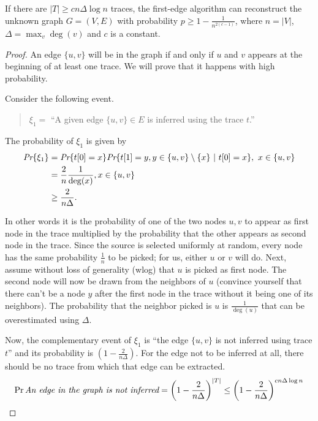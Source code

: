 \begin{thm}
    If there are $|T| \geq cn\Delta\log n$ traces, the first-edge algorithm can reconstruct the unknown graph $G=(V, E)$ with probability $p \geq 1 - \frac{1}{n^{2(c-1)}}$, where $n = |V|$, $\Delta = \max_v \deg(v)$ and $c$ is a constant.
\end{thm}
\begin{proof}
	An edge $\{u, v\}$ will be in the graph if and only if $u$ and $v$ appears at the beginning of at least one trace. We will prove that it happens with high probability.
	
	Consider the following event.
	\begin{quotation}
		$\xi_1 =$ ``A given edge $\{u, v\} \in E$ is inferred using the trace $t$.''
	\end{quotation}
	
	The probability of $\xi_1$ is given by
	\begin{align}
	\emph{Pr}\{\xi_1\} &= \emph{Pr}\{t[0] = x\}\emph{Pr}\{t[1] = y, y\in \{u, v\}\setminus\{x\}\ |\ t[0] = x\},\  x\in \{u, v\}\\
	&= \frac{2}{n}\frac{1}{\deg(x)}, x \in \{u, v\}\\
	&\geq \frac{2}{n\Delta}.
	\end{align}
	
	In other words it is the probability of one of the two nodes $u, v$ to appear as first node in the trace multiplied by the probability that the other appears as second node in the trace. Since the source is selected uniformly at random, every node has the same probability $\frac{1}{n}$ to be picked; for us, either $u$ or $v$ will do. Next, assume without loss of generality (wlog) that $u$ is picked as first node. The second node will now be drawn from the neighbors of $u$ (convince yourself that there can't be a node $y$ after the first node in the trace without it being one of its neighbors). The probability that the neighbor picked is $u$ is $\frac{1}{\deg(u)}$ that can be overestimated using $\Delta$.
	
	Now, the complementary event of $\xi_1$ is ``the edge $\{u,v\}$ is not inferred using trace $t$'' and its probability is $(1 - \frac{2}{n\Delta})$. For the edge not to be inferred at all, there should be no trace from which that edge can be extracted.
	\begin{equation}
	\Pr{\emph{An edge in the graph is not inferred}} = \left(1- \frac{2}{n\Delta}\right)^{|T|} \leq \left(1- \frac{2}{n\Delta}\right)^{cn\Delta\log n} 
	\end{equation}
	

\end{proof}
